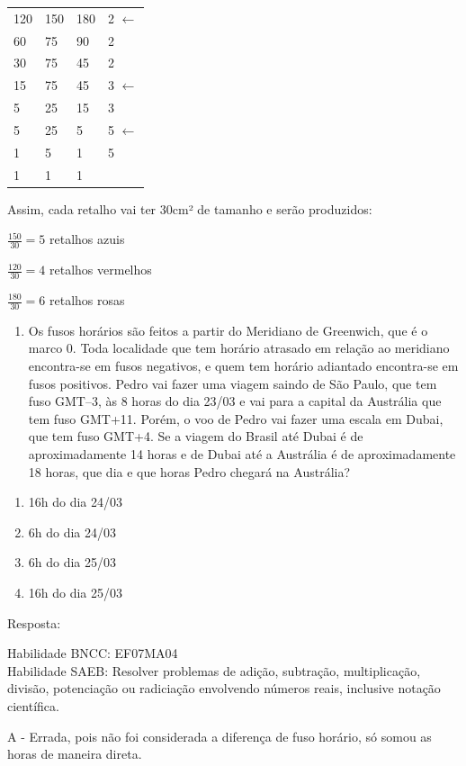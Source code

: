 \begin{longtable}[]{@{}llll@{}}
\toprule
\endhead
120 & 150 & 180 & 2 \(\leftarrow\)\tabularnewline
60 & 75 & 90 & 2\tabularnewline
30 & 75 & 45 & 2\tabularnewline
15 & 75 & 45 & 3 \(\leftarrow\)\tabularnewline
5 & 25 & 15 & 3\tabularnewline
5 & 25 & 5 & 5 \(\leftarrow\)\tabularnewline
1 & 5 & 1 & 5\tabularnewline
1 & 1 & 1 &\tabularnewline
\bottomrule
\end{longtable}

Assim, cada retalho vai ter 30cm² de tamanho e serão produzidos:

\(\frac{150}{30} = 5\) retalhos azuis

\(\frac{120}{30} = 4\) retalhos vermelhos

\(\frac{180}{30} = 6\) retalhos rosas


\begin{enumerate}
\def\labelenumi{\arabic{enumi})}
\tightlist
\item
  Os fusos horários são feitos a partir do Meridiano de Greenwich, que é
  o marco 0. Toda localidade que tem horário atrasado em relação ao
  meridiano encontra-se em fusos negativos, e quem tem horário adiantado
  encontra-se em fusos positivos. Pedro vai fazer uma viagem saindo de
  São Paulo, que tem fuso GMT--3, às 8 horas do dia 23/03 e vai para a
  capital da Austrália que tem fuso GMT+11. Porém, o voo de Pedro vai
  fazer uma escala em Dubai, que tem fuso GMT+4. Se a viagem do Brasil
  até Dubai é de aproximadamente 14 horas e de Dubai até a Austrália é
  de aproximadamente 18 horas, que dia e que horas Pedro chegará na
  Austrália?
\end{enumerate}

\begin{enumerate}
\def\labelenumi{\alph{enumi})}
\item
  16h do dia 24/03
\item
  6h do dia 24/03
\item
  6h do dia 25/03
\item
  16h do dia 25/03
\end{enumerate}

Resposta:

Habilidade BNCC: EF07MA04\\
Habilidade SAEB: Resolver problemas de adição, subtração, multiplicação,
divisão, potenciação ou radiciação envolvendo números reais, inclusive
notação científica.

A - Errada, pois não foi considerada a diferença de fuso horário, só
somou as horas de maneira direta.

